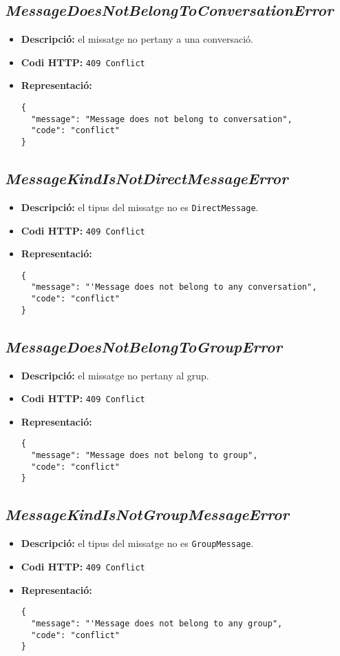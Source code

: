 \subsection{\emph{MessageDoesNotBelongToConversationError}}
\begin{itemize}
	\item \textbf{Descripció:} el missatge no pertany a una conversació.
	\item \textbf{Codi \ac{HTTP}:} \texttt{409 Conflict}
	\item \textbf{Representació:}
\begin{verbatim}
{
  "message": "Message does not belong to conversation",
  "code": "conflict"
}
\end{verbatim}
\end{itemize}
\subsection{\emph{MessageKindIsNotDirectMessageError}}
\begin{itemize}
	\item \textbf{Descripció:} el tipus del missatge no es \texttt{DirectMessage}.
	\item \textbf{Codi \ac{HTTP}:} \texttt{409 Conflict}
	\item \textbf{Representació:}
\begin{verbatim}
{
  "message": "'Message does not belong to any conversation",
  "code": "conflict"
}
\end{verbatim}
\end{itemize}
\subsection{\emph{MessageDoesNotBelongToGroupError}}
\begin{itemize}
	\item \textbf{Descripció:} el missatge no pertany al grup.
	\item \textbf{Codi \ac{HTTP}:} \texttt{409 Conflict}
	\item \textbf{Representació:}
\begin{verbatim}
{
  "message": "Message does not belong to group",
  "code": "conflict"
}
\end{verbatim}
\end{itemize}
\subsection{\emph{MessageKindIsNotGroupMessageError}}
\begin{itemize}
	\item \textbf{Descripció:} el tipus del missatge no es \texttt{GroupMessage}.
	\item \textbf{Codi \ac{HTTP}:} \texttt{409 Conflict}
	\item \textbf{Representació:}
\begin{verbatim}
{
  "message": "'Message does not belong to any group",
  "code": "conflict"
}
\end{verbatim}
\end{itemize}
